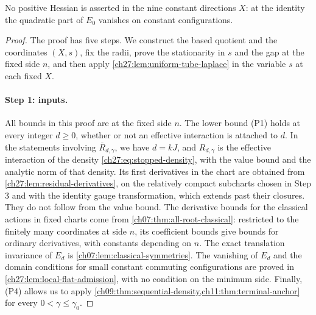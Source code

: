 No positive Hessian is asserted in the nine constant directions $X$: at the identity the quadratic part of $E_0$ vanishes on constant configurations.

\begin{proof}
The proof has five steps. We construct the based quotient and the coordinates $(X,s)$, fix the radii, prove the stationarity in $s$ and the gap at the fixed side $n$, and then apply \cref{ch27:lem:uniform-tube-laplace} in the variable $s$ at each fixed $X$.

\paragraph{Step 1: inputs.}
All bounds in this proof are at the fixed side $n$. The lower bound (P1) holds at every integer $d\ge0$, whether or not an effective interaction is attached to $d$. In the statements involving $\overline R_{d,\gamma}$, we have $d=kJ$, and $R_{d,\gamma}$ is the effective interaction of the density \eqref{ch27:eq:stopped-density}, with the value bound and the analytic norm of that density. Its first derivatives in the chart are obtained from \cref{ch27:lem:residual-derivatives}, on the relatively compact subcharts chosen in Step 3 and with the identity gauge transformation, which extends past their closures. They do not follow from the value bound. The derivative bounds for the classical actions in fixed charts come from \cref{ch07:thm:all-root-classical}: restricted to the finitely many coordinates at side $n$, its coefficient bounds give bounds for ordinary derivatives, with constants depending on $n$. The exact translation invariance of $E_d$ is \cref{ch07:lem:classical-symmetries}. The vanishing of $E_d$ and the domain conditions for small constant commuting configurations are proved in \cref{ch27:lem:local-flat-admission}, with no condition on the minimum side. Finally, (P4) allows us to apply \cref{ch09:thm:sequential-density,ch11:thm:terminal-anchor} for every $0<\gamma\le\gamma_0$.


\end{proof}

